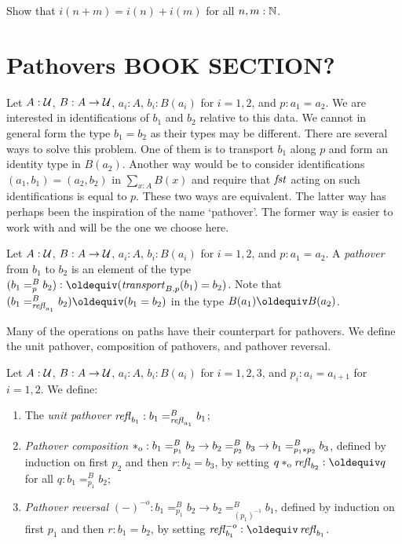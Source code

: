 \documentclass[a4,12pt]{amsart}
\begin{document}
\begin{xca}\label{xca:addition-on-Z-and-N}
Show that $i(n+m)=i(n)+i(m)$ for all $n,m:\mathbb{N}$.
\end{xca}

\section{Pathovers BOOK SECTION?}
\label{sec:pathovers}

Let $A : \mathcal{U}$, $B : A \to \mathcal{U}$, $a_i:A$, $b_i:B(a_i)$ for $i=1,2$, and $p : a_1 = a_2$.
We are interested in identifications of $b_1$ and $b_2$ relative to this data.
We cannot in general form the type $b_1 = b_2$ as their types may be different.
There are several ways to solve this problem. One of them is to transport $b_1$ along
$p$ and form an identity type in $B(a_2)$. Another way would be to consider
identifications $(a_1,b_1) = (a_2,b_2)$ in $\sum_{x:A} B(x)$ and require that $\mathop{\mathit{fst}}$
acting on such identifications is equal to $p$. These two ways are equivalent.
The latter way has perhaps been the inspiration of the name `pathover'.
The former way is easier to work with and will be the one we choose here.

\begin{definition}\label{def:pathover}
Let $A : \mathcal{U}$, $B : A \to \mathcal{U}$, $a_i:A$, $b_i:B(a_i)$ for $i=1,2$, and $p : a_1 = a_2$.
A \emph{pathover} from $b_1$ to $b_2$ is an element of the type
$(b_1 =^B_p b_2) \defeq (\trp_{B,p}(b_1) = b_2)$. 
Note that $(b_1 =^B_{\refl{a_1}} b_2) \jdeq (b_1 =b_2)$ 
in the type $B(a_1)\jdeq B(a_2)$.
\end{definition}

Many of the operations on paths have their counterpart for pathovers.
We define the unit pathover, composition of pathovers, and pathover reversal.

\begin{definition}\label{def:pathoveralgebra}
Let $A : \mathcal{U}$, $B : A \to \mathcal{U}$, $a_i:A$, $b_i:B(a_i)$ for $i=1,2,3$, and 
$p_i : a_i = a_{i+1}$ for $i=1,2$. We define:
\begin{enumerate}
\item The \emph{unit pathover} $\mathop{{\it refl}_{b_1}} : b_1 =^B_{\mathop{{\it refl}_{a_1}}} b_1$;
\item \emph{Pathover composition} $*_{\mathrm{o}} : b_1 =^B_{p_1} b_2 \to
b_2 =^B_{p_2} b_3 \to b_1 =^B_{p_1 * p_2} b_3$, defined by induction
on first $p_2$ and then $r: b_2 = b_3$, by
setting $q \cto \refl{b_2} \defeq q$ for all $q: b_1 =^B_{p_1} b_2$;
\item \emph{Pathover reversal} $({-})^{-o} : b_1 =^B_{p_1} b_2 \to
b_2 =^B_{(p_1)^{-1}} b_1$, defined by induction on first $p_1$ and then $r: b_1 = b_2$, by
setting $\refloi{b_1} \defeq \refl{b_1}$.
\end{enumerate}
\end{definition}
\end{document}
